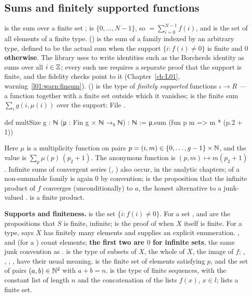 \subsection{Sums and finitely supported functions}\label{ch01:sec:sums}

 is the sum over a finite set ;  is
$\{0,\dots,N-1\}$, so  $=\sum_{i=0}^{N-1}f(i)$, and
 is the set of all elements of a finite type.  () is
the sum of a family indexed by an arbitrary type, defined to be the actual sum when the support
$\{i : f(i)\ne0\}$ is finite and \textbf{$0$ otherwise}. The library uses  to write
identities such as the Borcherds identity as sums over all $i\in{\mathbb{Z}}$; every such use requires a
separate proof that the support is finite, and the fidelity checks point to it (Chapter~\ref{ch:L01},
warning~\ref{l01:warn:finsum}).  () is the type of \emph{finitely
supported} functions $\iota\to R$ --- a function together with a finite set outside which it
vanishes;  is the finite sum $\sum_{i}g(i,\mu(i))$ over the support:
\noindent File .
\begin{leancode}
def multSize {g : ℕ} (μ : Fin g × ℕ →₀ ℕ) : ℕ := μ.sum (fun p m => m * (p.2 + 1))
\end{leancode}
Here $\mu$ is a multiplicity function on pairs $p = (i,m)\in\{0,\dots,g-1\}\times{\mathbb{N}}$, and the value is
$\sum_p\mu(p)\,(p_2+1)$. The anonymous function  is $(p,m)\mapsto m(p_2+1)$.
Infinite sums of convergent series (, ) also occur, in the analytic chapters;
 of a non-summable family is again $0$ by convention;  is the proposition that
the infinite product of $f$ converges (unconditionally) to $a$, the honest alternative to a junk-valued
.  is a finite product.

\textbf{Supports and finiteness.}  is the set $\{i : f(i)\ne0\}$. For a set
,  and  are the propositions that $S$ is finite,
infinite;  is the proof of  when $X$ itself is finite. For a type,
 says $X$ has finitely many elements and  supplies an explicit
enumeration. ,  and  (for a ) count
elements; \textbf{the first two are $0$ for infinite sets}, the same junk convention as
.  is the type of subsets of $X$,  the whole of $X$,
 the image of $f$; , , , ,  have their usual
meaning.  is the finite set of elements satisfying $p$, and
 the set of pairs $(a,b)\in{\mathbb{N}}^2$ with $a+b = n$.  is the type
of finite sequences, with  the constant list of length $n$ and
 the concatenation of the lists $f(x)$, $x\in l$;  lists a finite set.

